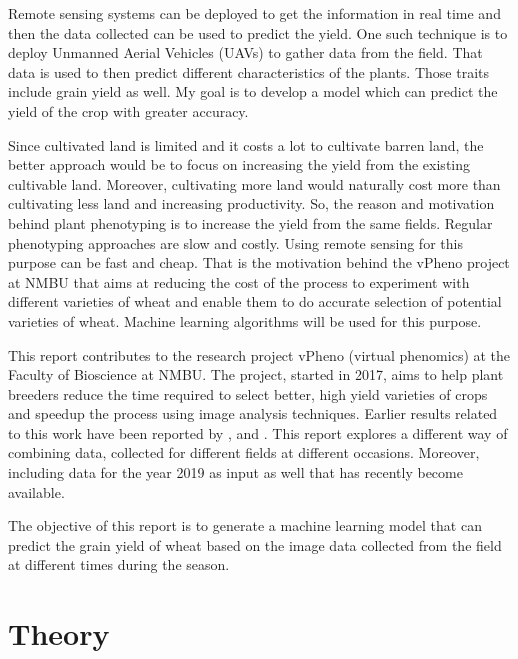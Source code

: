 \documentclass[sigconf, nonacm, natbib, screen, balance=False]{acmart}
\begin{document}
Remote sensing systems can be deployed to get the information in real time and then the data collected can be used to predict the yield. One such technique is to deploy Unmanned Aerial Vehicles (UAVs) to gather data from the field. That data is used to then predict different characteristics of the plants. Those traits include grain yield as well. My goal is to develop a model which can predict the yield of the crop with greater accuracy.



Since cultivated land is limited and it costs a lot to cultivate barren land, the better approach would be to focus on increasing the yield from the existing cultivable land. Moreover, cultivating more land would naturally cost more than cultivating less land and increasing productivity. So, the reason and motivation behind plant phenotyping is to increase the yield from the same fields. Regular phenotyping approaches are slow and costly. Using remote sensing for this purpose can be fast and cheap. That is the motivation behind the vPheno project at NMBU that aims at reducing the cost of the process to experiment with different varieties of wheat and enable them to do accurate selection of potential varieties of wheat. Machine learning algorithms will be used for this purpose.

This report contributes to the research project vPheno (virtual phenomics) at the Faculty of Bioscience at NMBU. The project, started in 2017, aims to help plant breeders reduce the time required to select better, high yield varieties of crops and speedup the process using image analysis techniques. Earlier results related to this work have been reported by \citet{burud_bleken}, \citet{grindbakken} and \citet{lied}. This report explores a different way of combining data, collected for different fields at different occasions. Moreover, including data for the year 2019 as input as well that has recently become available.


The objective of this report is to generate a machine learning model that can predict the grain yield of wheat based on the image data collected from the field at different times during the season.


\section{Theory}\label{sec:theory}
\end{document}
